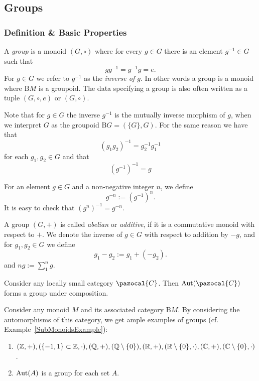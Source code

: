 \subsection{Groups}
\subsubsection{Definition \& Basic Properties}
\begin{definition}
    A \textit{group} is a monoid $(G,\circ)$ where for every $g\in G$ there is an element $g^{-1}\in G$ such that
    $$gg^{-1}=g^{-1}g = e.$$
    For $g\in G$ we refer to $g^{-1}$ as the \textit{inverse of $g$}. In other words a group is a monoid where $\mathrm{B}M$ is a groupoid. The data specifying a group is also often written as a tuple $(G,\circ,e)$ or $(G,\circ)$.
\end{definition}
\begin{remark}
    Note that for $g\in G$ the inverse $g^{-1}$ is the mutually inverse morphism of $g$, when we interpret $G$ as the groupoid $\mathrm{B}G = (\{G\},G)$. For the same reason we have that 
    $$
        \left(g_1g_2\right)^{-1} = g_2^{-1}g_1^{-1}
    $$
    for each $g_1,g_2\in G$ and that 
    $$
        \left(g^{-1}\right)^{-1} = g
    $$
\end{remark}
\begin{remark}
    For an element $g\in G$ and a non-negative integer $n$, we define 
    $$
        g^{-n} := \left(g^{-1}\right)^n.
    $$ 
    It is easy to check that $\left( g^n\right)^{-1}=g^{-n}$. 
\end{remark}
\begin{definition}
    A group $(G,+)$ is called \textit{abelian} or \textit{additive}, if it is a commutative monoid with respect to $+$. We denote the inverse of $g\in G$ with respect to addition by $-g$, and for $g_1,g_2\in G$ we define 
    $$g_1-g_2 := g_1+(-g_2).$$
    and $ng := \sum_1^n g$.
\end{definition}
\begin{example}
    Consider any locally small category $\pazocal{C}$. Then $\Aut(\pazocal{C})$ forms a group under composition. 
\end{example}
\begin{example}
    Consider any monoid $M$ and its associated category $\mathrm{B}M$. By considering the automorphisms of this category, we get ample examples of groups (cf. Example~\ref{SubMonoidsExample}): 
    \begin{enumerate}
        \item $(\mathbb{Z},+),(\{-1,1\}\subset \mathbb{Z},\cdot),(\mathbb{Q},+),(\mathbb{Q}\setminus\{0\}),(\mathbb{R},+),(\mathbb{R}\setminus\{0\},\cdot),(\mathbb{C},+),(\mathbb{C}\setminus\{0\},\cdot)$.
        \item $\mathrm{Aut}(A)$ is a group for each set $A$. 
    \end{enumerate}
\end{example}
